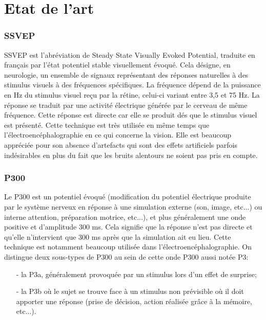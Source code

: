 \part{Etat de l'art} %
\label{prt:etat}
	\section{SSVEP} %
	SSVEP est l'abréviation de Steady State Visually Evoked Potential, traduite en français par l'état potentiel stable visuellement évoqué. Cela désigne, en neurologie, un ensemble de signaux représentant des réponses naturelles à des stimulus visuels à des fréquences spécifiques. La fréquence dépend de la puissance en Hz du stimulus visuel reçu par la rétine, celui-ci variant entre 3,5 et 75 Hz. La réponse se traduit par une activité électrique générée par le cerveau de même fréquence. Cette réponse est directe car elle se produit dés que le stimulus visuel est présenté.
		Cette technique est très utilisée en même temps que l'électroencéphalographie en ce qui concerne la vision. Elle est beaucoup appréciée pour son absence d'artefacts qui sont des effets artificiels parfois indésirables en plus du fait que les bruits alentours ne soient pas pris en compte.
	\label{sec:technique_ssvep}
	
	\section{P300} %
	Le P300 est un potentiel évoqué (modification du potentiel électrique produite par le système nerveux en réponse à une simulation externe (son, image, etc...) ou interne attention, préparation motrice, etc...), et plus généralement une onde positive et d'amplitude 300 ms. Cela signifie que la réponse n'est pas directe et qu'elle n'intervient que 300 ms après que la simulation ait eu lieu. Cette technique est notamment beaucoup utilisée dans l'électroencéphalographie.
			On distingue deux sous-types de P300 au sein de cette onde P300 aussi notée P3:
			\begin{itemize}
			\item[-] la P3a, généralement provoquée par un stimulus lors d'un effet de surprise;
			\item[-] la P3b où le sujet se trouve face à un stimulus non prévisible où il doit apporter une réponse (prise de décision, action réalisée grâce à la mémoire, etc...).
\end{itemize}			
	\label{sec:technique_p300}
